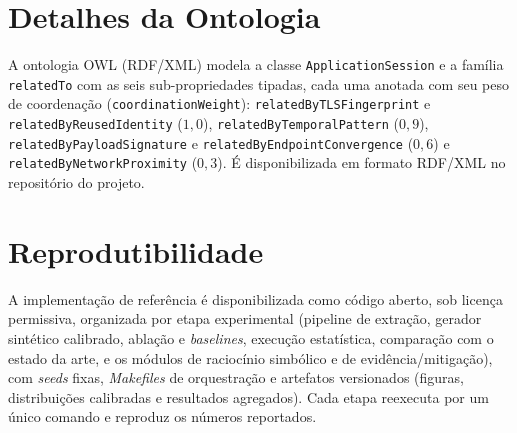 \documentclass[preprint,12pt]{elsarticle}
\begin{document}





\appendix

\section{Detalhes da Ontologia}
\label{app:ontology}

A ontologia OWL (RDF/XML) modela a classe \texttt{ApplicationSession} e a família
\texttt{relatedTo} com as seis sub-propriedades tipadas, cada uma anotada com seu peso
de coordenação (\texttt{coordinationWeight}): \texttt{relatedByTLSFingerprint} e
\texttt{relatedByReusedIdentity} ($1{,}0$), \texttt{relatedByTemporalPattern} ($0{,}9$),
\texttt{relatedByPayloadSignature} e \texttt{relatedByEndpointConvergence} ($0{,}6$) e
\texttt{relatedByNetworkProximity} ($0{,}3$). É disponibilizada em formato RDF/XML no
repositório do projeto.

\section{Reprodutibilidade}
\label{app:reproducibility}

A implementação de referência é disponibilizada como código aberto, sob licença
permissiva, organizada por etapa experimental (pipeline de extração, gerador
sintético calibrado, ablação e \emph{baselines}, execução estatística, comparação com
o estado da arte, e os módulos de raciocínio simbólico e de evidência/mitigação), com
\emph{seeds} fixas, \emph{Makefiles} de orquestração e artefatos versionados (figuras,
distribuições calibradas e resultados agregados). Cada etapa reexecuta por um único
comando e reproduz os números reportados.
\end{document}
